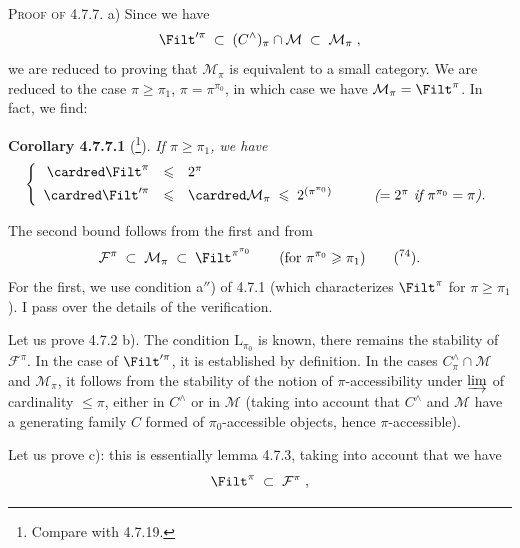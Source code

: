 \textsc{Proof of} 4.7.7. a) Since we have
\[
\Filt'^{\pi} \;\subset\; (C^{\wedge})_{\pi} \cap \mathcal{M} \;\subset\; \mathcal{M}_{\pi} \;,
\]
we are reduced to proving that $\mathcal{M}_{\pi}$ is equivalent to a small category. We are reduced to the case $\pi \geqslant \pi_1$, $\pi = \pi^{\pi_0}$, in which case we have $\mathcal{M}_{\pi} = \Filt^{\pi}$. In fact, we find:

\textbf{Corollary 4.7.7.1} (\footnote[73]{Compare with 4.7.19.}). \textit{If $\pi \geqslant \pi_1$, we have}
\[
\left\{
\begin{array}{rcll}
\cardred \Filt^{\pi} & \leqslant & 2^{\pi} & \\[4pt]
\cardred \Filt'^{\pi} & \leqslant & \cardred \mathcal{M}_{\pi} \;\leqslant\; 2^{(\pi^{\pi_0})} & \qquad \textit{($= 2^{\pi}$ if $\pi^{\pi_0} = \pi$).}
\end{array}
\right.
\]

The second bound follows from the first and from
\[
\mathcal{F}^{\pi} \;\subset\; \mathcal{M}_{\pi} \;\subset\; \Filt^{\pi^{\pi_0}} \qquad (\text{for } \pi^{\pi_0} \geqslant \pi_1) \qquad \text{(\footnotemark[74]).}
\]
For the first, we use condition a$''$) of 4.7.1 (which characterizes $\Filt^{\pi}$ for $\pi \geqslant \pi_1$). I pass over the details of the verification.

Let us prove 4.7.2 b). The condition $\mathrm{L}_{\pi_0}$ is known, there remains the stability of $\mathcal{F}^{\pi}$. In the case of $\Filt'^{\pi}$, it is established by definition. In the cases $C^{\wedge}_{\pi} \cap \mathcal{M}$ and $\mathcal{M}_{\pi}$, it follows from the stability of the notion of $\pi$-accessibility under $\varinjlim$ of cardinality $\leqslant \pi$, either in $C^{\wedge}$ or in $\mathcal{M}$ (taking into account that $C^{\wedge}$ and $\mathcal{M}$ have a generating family $C$ formed of $\pi_0$-accessible objects, hence $\pi$-accessible).

Let us prove c): this is essentially lemma 4.7.3, taking into account that we have
\[
\Filt^{\pi} \;\subset\; \mathcal{F}^{\pi} \;,
\]